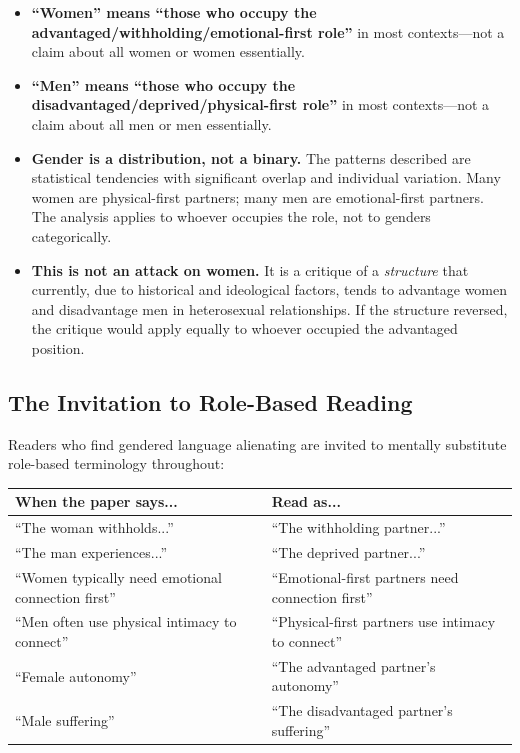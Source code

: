\documentclass[12pt,openany]{book}
\numberwithin{equation}{chapter}
\begin{document}
\begin{itemize}
    \item \textbf{``Women'' means ``those who occupy the advantaged/withholding/emotional-first role''} in most contexts---not a claim about all women or women essentially.
    
    \item \textbf{``Men'' means ``those who occupy the disadvantaged/deprived/physical-first role''} in most contexts---not a claim about all men or men essentially.
    
    \item \textbf{Gender is a distribution, not a binary.} The patterns described are statistical tendencies with significant overlap and individual variation. Many women are physical-first partners; many men are emotional-first partners. The analysis applies to whoever occupies the role, not to genders categorically.
    
    \item \textbf{This is not an attack on women.} It is a critique of a \textit{structure} that currently, due to historical and ideological factors, tends to advantage women and disadvantage men in heterosexual relationships. If the structure reversed, the critique would apply equally to whoever occupied the advantaged position.
\end{itemize}

\subsection{The Invitation to Role-Based Reading}

Readers who find gendered language alienating are invited to mentally substitute role-based terminology throughout:

\begin{center}
\begin{tabular}{|p{2.5in}|p{2.5in}|}
\hline
\textbf{When the paper says...} & \textbf{Read as...} \\
\hline
``The woman withholds...'' & ``The withholding partner...'' \\
\hline
``The man experiences...'' & ``The deprived partner...'' \\
\hline
``Women typically need emotional connection first'' & ``Emotional-first partners need connection first'' \\
\hline
``Men often use physical intimacy to connect'' & ``Physical-first partners use intimacy to connect'' \\
\hline
``Female autonomy'' & ``The advantaged partner's autonomy'' \\
\hline
``Male suffering'' & ``The disadvantaged partner's suffering'' \\
\hline
\end{tabular}
\end{center}
\end{document}
